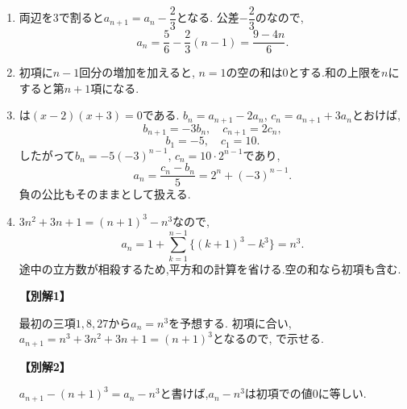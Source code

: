 \begin{enumerate}[label=\textbf{問\arabic*.},leftmargin=3.8em,format=\bookitemlink{practice-basic}{solution}{problem}]
          \item 両辺を$3$で割ると$a_{n+1}=a_n-\dfrac{2}{3}$となる.
                  公差$-\dfrac{2}{3}$のなので,
                  \[
                    a_n=\frac56-\frac23(n-1)=\frac{9-4n}{6}.
                  \]

          \item 初項に$n-1$回分の増加を加えると,
                  \BookMathLayout{\[
                  \begin{aligned}
                    a_n&=2+\sum_{k=1}^{n-1}(3k-1)\\
                       &=2+\frac{3n(n-1)}2-(n-1)
                        =\frac{3n^2-5n+6}{2}.
                  \end{aligned}
                  \]}{\[
                  \begin{aligned}
                    a_n&=2+\sum_{k=1}^{n-1}(3k-1)\\
                       &=2+\frac{3n(n-1)}2-(n-1)\\
                       &=\frac{3n^2-5n+6}{2}.
                  \end{aligned}
                  \]}
                  $n=1$の空の和は$0$とする.和の上限を$n$にすると第$n+1$項になる.

          \item {}は$(x-2)(x+3)=0$である.
                  $b_n=a_{n+1}-2a_n$, $c_n=a_{n+1}+3a_n$とおけば,
                  \[
                    b_{n+1}=-3b_n,\quad c_{n+1}=2c_n,
                  \]
                  \[
                    b_1=-5,\quad c_1=10.
                  \]
                  したがって$b_n=-5(-3)^{n-1}$, $c_n=10\cdot2^{n-1}$であり,
                  \[
                    a_n=\frac{c_n-b_n}{5}=2^n+(-3)^{n-1}.
                  \]
                  負の公比もそのままとして扱える.

          \item $3n^2+3n+1=(n+1)^3-n^3$なので,
                  \[
                    a_n=1+\sum_{k=1}^{n-1}\{(k+1)^3-k^3\}=n^3.
                  \]
                  途中の立方数が相殺するため,平方和の計算を省ける.空の和なら初項も含む.
                  \par\smallskip\noindent\textbf{【別解1】}\par
                  最初の三項$1,8,27$から$a_n=n^3$を予想する.
                  初項に合い,$a_{n+1}=n^3+3n^2+3n+1=(n+1)^3$となるので,
                  で示せる.
                  \par\smallskip\noindent\textbf{【別解2】}\par
                  $a_{n+1}-(n+1)^3=a_n-n^3$と書けば,$a_n-n^3$は初項での値$0$に等しい.


\end{enumerate}
